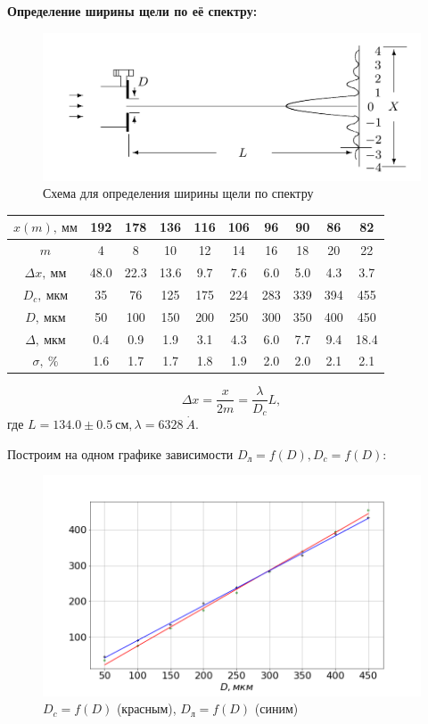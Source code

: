 \documentclass[10pt, a4paper]{article}
\begin{document}
	\textbf{Определение ширины щели по её спектру:}
	
\begin{figure}[H]
	\includegraphics[width = 1.0\linewidth]{2.png}
	\caption*{Схема для определения ширины щели по спектру}
\end{figure}
\begin{table}[H]
	\centering
	\begin{tabular}{|c|c|c|c|c|c|c|c|c|c|}  \hline
	$x(m),\ мм$ & 192 & 178 & 136 & 116 & 106 & 96 & 90 & 86 & 82 \\\hline
	$m$ & 4 & 8 & 10 & 12 & 14 & 16 & 18 & 20 & 22 \\\hline
	$\Delta x,\ мм$ & 48.0 & 22.3 & 13.6 & 9.7 & 7.6 & 6.0 & 5.0 & 4.3 & 3.7 \\\hline
	$D_c,\ мкм$ & 35 & 76 & 125 & 175 & 224 & 283 & 339 &  394  & 455 \\\hline
	$D,\ мкм$ & 50 & 100 & 150 & 200 & 250 & 300 & 350 & 400 & 450 \\\hline
	$\Delta,\ мкм$ & 0.4 & 0.9 & 1.9 & 3.1 & 4.3 & 6.0 & 7.7 & 9.4 & 18.4 \\\hline
	$\sigma,\ \%$ & 1.6 & 1.7 & 1.7 & 1.8 & 1.9 & 2.0 & 2.0 & 2.1 & 2.1 \\\hline
	\end{tabular}
	\end{table}
\[
	\Delta x = \frac{x}{2m} = \frac{\lambda}{D_c}L,
\]	
где $L = 134.0 \pm 0.5\ см, \lambda = 6328\ \dot A $.

Построим на одном графике зависимости $D_л = f(D), D_c = f(D)$:
	\begin{figure}[H]
	\includegraphics[width = 1.0\linewidth]{g1.png}
	\caption*{$D_c = f(D)$ (красным), $D_л  = f(D)$ (синим)}
	
\end{figure}	
\end{document}
